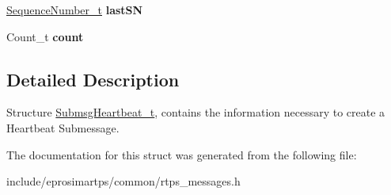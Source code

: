 \begin{DoxyCompactItemize}
\item 
\hypertarget{structeprosima_1_1rtps_1_1_submsg_heartbeat__t_a5e432915e6c56d87722b2a5949e683af}{\hyperlink{structeprosima_1_1rtps_1_1_sequence_number__t}{\-Sequence\-Number\-\_\-t} {\bfseries last\-S\-N}}\label{structeprosima_1_1rtps_1_1_submsg_heartbeat__t_a5e432915e6c56d87722b2a5949e683af}

\item 
\hypertarget{structeprosima_1_1rtps_1_1_submsg_heartbeat__t_a3961401c1a668c58f7511e729d0be39e}{\-Count\-\_\-t {\bfseries count}}\label{structeprosima_1_1rtps_1_1_submsg_heartbeat__t_a3961401c1a668c58f7511e729d0be39e}

\end{DoxyCompactItemize}


\subsection{\-Detailed \-Description}
\-Structure \hyperlink{structeprosima_1_1rtps_1_1_submsg_heartbeat__t}{\-Submsg\-Heartbeat\-\_\-t}, contains the information necessary to create a \-Heartbeat \-Submessage. 

\-The documentation for this struct was generated from the following file\-:\begin{DoxyCompactItemize}
\item 
include/eprosimartps/common/rtps\-\_\-messages.\-h\end{DoxyCompactItemize}

